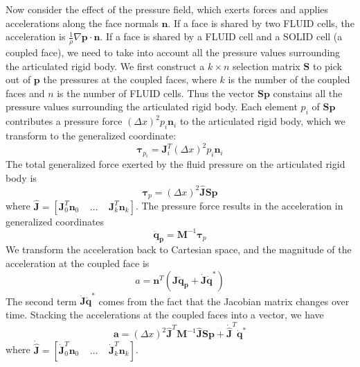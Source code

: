 Now consider the effect of the pressure field, which exerts forces and
applies accelerations along the face normals $\mathbf{n}$. If a face is
shared by two FLUID cells, the acceleration is
$\frac{1}{\rho}\nabla\mathbf{p}\cdot\mathbf{n}$. If a face is shared by a
FLUID cell and a SOLID cell (a coupled face), we need to take into account
all the pressure values surrounding the articulated rigid body. We first
construct a $k\times n$ selection matrix $\mathbf{S}$ to pick out of $\mathbf{p}$ the
pressures at the coupled faces, where $k$ is the number
of the coupled faces and $n$ is the number of FLUID cells. Thus the vector
$\mathbf{Sp}$ constains all the pressure values surrounding the
articulated rigid body. Each element $p_i$ of $\mathbf{Sp}$ contributes a
pressure force $(\Delta x)^2p_i\mathbf{n}_i$ to the articulated rigid
body, which we transform to the generalized coordinate:
\begin{displaymath}
\mathbf{\tau}_{p_i}=\mathbf{J}_i^T(\Delta x)^2p_i\mathbf{n}_i
\end{displaymath}
The total generalized force exerted by the fluid pressure on the articulated rigid body is
\begin{displaymath}
\mathbf{\tau}_p=(\Delta x)^2\hat{\mathbf{J}}\mathbf{Sp}
\end{displaymath}
where $\hat{\mathbf{J}}=[\mathbf{J}_0^T\mathbf{n}_0~~~~~\ldots~~~~~\mathbf{J}_k^T\mathbf{n}_k]$. The pressure force results in the acceleration in generalized coordinates
\begin{displaymath}
\mathbf{\mathbf{\ddot{q}}_{p}}=\mathbf{M}^{-1}\mathbf{\tau}_{p}
\end{displaymath}
We transform the acceleration back to Cartesian space, and the magnitude of the acceleration at the coupled face is
\begin{displaymath}
a=\mathbf{n}^T(\mathbf{J\ddot{q}_p}+\mathbf{\dot{J}\dot{q}}^*)
\end{displaymath}
The second term $\mathbf{\dot{J}\dot{q}}^*$ comes from the fact that the Jacobian matrix changes over time. Stacking the accelerations at the coupled faces into a vector, we have
\begin{equation}
\label{eq:acceleration}
\mathbf{a}=(\Delta x)^2\hat{\mathbf{J}}^T\mathbf{M}^{-1}\hat{\mathbf{J}}\mathbf{Sp}+\dot{\hat{\mathbf{J}}}^T\mathbf{\dot{q}}^*
\end{equation}
where
$\dot{\hat{\mathbf{J}}}=[\mathbf{\dot{J}}_0^T\mathbf{n}_0~~~~~\ldots~~~~~\mathbf{\dot{J}}_k^T\mathbf{n}_k]$.

